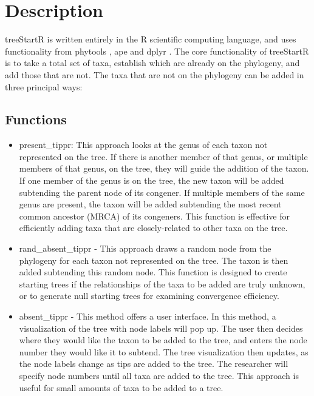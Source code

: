 \section{Description}

treeStartR is written entirely in the R scientific computing language, and uses functionality from phytools \citep{phytools}, ape \citep{ape} and dplyr \citep{dplyr}.
The core functionality of treeStartR is to take a total set of taxa, establish which are already on the phylogeny, and add those that are not.
The taxa that are not on the phylogeny can be added in three principal ways: 

\subsection{Functions} 
\begin{itemize}
\item present\_tippr: This approach looks at the genus of each taxon not represented on the tree. 
If there is another member of that genus, or multiple members of that genus, on the tree, they will guide the addition of the taxon.
If one member of the genus is on the tree, the new taxon will be added subtending the parent node of its congener. 
If multiple members of the same genus are present, the taxon will be added subtending the most recent common ancestor (MRCA) of its congeners.
This function is effective for efficiently adding taxa that are closely-related to other taxa on the tree.

\item rand\_absent\_tippr - This approach draws a random node from the phylogeny for each taxon not represented on the tree.
The taxon is then added subtending this random node.
This function is designed to create starting trees if the relationships of the taxa to be added are truly unknown, or to generate null starting trees for examining convergence efficiency.

\item absent\_tippr - This method offers a user interface.
In this method, a visualization of the tree with node labels will pop up. 
The user then decides where they would like the taxon to be added to the tree, and enters the node number they would like it to subtend.
The tree visualization then updates, as the node labels change as tips are added to the tree. 
The researcher will specify node numbers until all taxa are added to the tree. 
This approach is useful for small amounts of taxa to be added to a tree.


\end{itemize}
